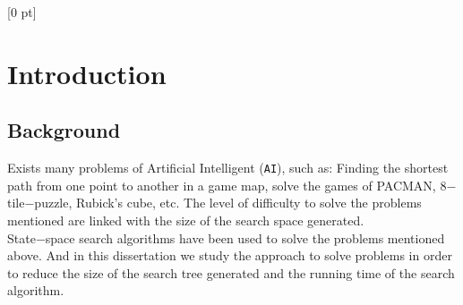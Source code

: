 \titlespacing{\chapter}{0 pt}{30 pt}{50 pt}[0 pt]
\titleformat{\section}{\Large\bfseries}{\thesection}{0 pt}{\hspace{30 pt}}
\titleformat{\subsection}{\large\bfseries}{\thesubsection}{0 pt}{\hspace{30 pt}}
\pagestyle{fancy}
\renewcommand{\chaptername}{CHAPTER}
\fancyhead[LO,LE]{\footnotesize\textit{\leftmark}}
\fancyhead[RO,RE]{\thepage}
\fancyfoot[CO,CE]{}
\chapter{Introduction} %
\normalsize
\section{Background}
\vspace{30 pt}
\noindent
Exists many problems of Artificial Intelligent (\texttt{AI}), such as: Finding the shortest path from one point to another in a game map, solve the games of PACMAN, 8$-$tile$-$puzzle, Rubick's cube, etc. The level of difficulty to solve the problems mentioned are linked with the size of the search space generated. \\

State$-$space search algorithms have been used to solve the problems mentioned above. And in this dissertation we study the approach to solve problems in order to reduce the size of the search tree generated and the running time of the search algorithm. \\

